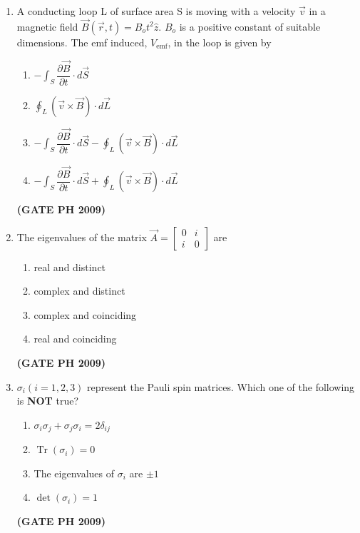 \documentclass[14pt, a4paper]{extarticle}
\renewcommand{\vec}[1]{\overrightarrow{#1}}
\newcommand{\myvec}[1]{\begin{bmatrix} #1 \end{bmatrix}}
\begin{document}
\begin{enumerate}[label=\textbf{Q. \arabic*}]
\item A conducting loop L of surface area S is moving with a velocity $\vec{v}$ in a magnetic field $\vec{B}(\vec{r}, t) = B_o t^2 \hat{z}$.
$B_o$ is a positive constant of suitable dimensions. The emf induced, $V_{\text{emf}}$, in the loop is given by
\begin{multicols}{2}
\begin{enumerate}
\item $-\int_S \dfrac{\partial\vec{B}}{\partial t} \cdot d\vec{S}$
\item $\oint_L (\vec{v} \times \vec{B}) \cdot d\vec{L}$
\item $-\int_S \dfrac{\partial\vec{B}}{\partial t} \cdot d\vec{S} - \oint_L (\vec{v} \times \vec{B}) \cdot d\vec{L}$
\item $-\int_S \dfrac{\partial\vec{B}}{\partial t} \cdot d\vec{S} + \oint_L (\vec{v} \times \vec{B}) \cdot d\vec{L}$
\end{enumerate}
\end{multicols}
\hfill \textbf{(GATE PH 2009)}

\item The eigenvalues of the matrix $\vec{A} = \myvec{0 & i \\ i & 0}$ are
    \begin{multicols}{2}
    \begin{enumerate}
        \item real and distinct
        \item complex and distinct
        \item complex and coinciding
        \item real and coinciding
    \end{enumerate}
    \end{multicols}
    \hfill \textbf{(GATE PH 2009)}
    

\item $\sigma_i (i=1, 2, 3)$ represent the Pauli spin matrices. Which one of the following is \textbf{NOT} true?
    \begin{multicols}{2}
    \begin{enumerate}
        \item $\sigma_i \sigma_j + \sigma_j \sigma_i = 2\delta_{ij}$
        \item $\operatorname{Tr}(\sigma_i) = 0$
        \item The eigenvalues of $\sigma_i$ are $\pm 1$
        \item $\det(\sigma_i) = 1$
    \end{enumerate}
    \end{multicols}
    \hfill \textbf{(GATE PH 2009)}


\end{enumerate}
\end{document}
